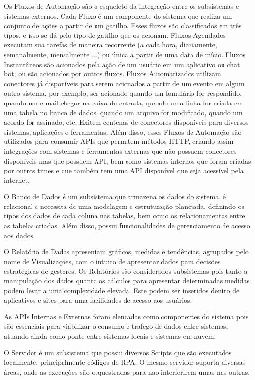 	Os Fluxos de Automação são o esqueleto da integração entre os subsistemas e sistemas externos. Cada Fluxo é um componente do sistema que realiza um conjunto de ações a partir de um gatilho.
	Esses fluxos são classificados em três tipos, e isso se dá pelo tipo de gatilho que os acionam.	Fluxos Agendados executam sua tarefas de maneira recorrente (a cada hora, diariamente,
	semanalmente, mensalmente ...) ou única a partir de uma data de início. Fluxos Instantâneos são acionados pela ação de um usuário em um aplicativo ou chat bot, ou são acionados por outros
	fluxos. Fluxos Automatizados utilizam conectores já disponíveis para serem acionados a partir de um evento em algum outro sistema, por exemplo, ser acionado quando um fomulário for respondido,
	quando um e-mail chegar na caixa de entrada, quando uma linha for criada em uma tabela no banco de dados, quando um arquivo for modificado, quando um acordo for assinado, etc. Exitem centenas
	de conectores disponíveis para diversos sistemas, aplicações e ferramentas.	Além disso, esses Fluxos de Automação são utilizados para consumir APIs que permitem métodos HTTP, criando assim 
	integrações com sistemas e ferramentas externas que não possuem conectores disponíveis mas que possuem API, bem como sistemas internos que foram criadas por outros times e que também tem
	uma API disponível que seja acessível pela internet.

	O Banco de Dados é um subsistema que armazena os dados do sistema, é relacional e necessita de uma modelagem e estruturação planejada, definindo os tipos dos dados de cada coluna nas tabelas,
	bem como os relacionamentos entre as tabelas criadas. Além disso, possui funcionalidades de gerenciamento de acesso aos dados.

	O Relatório de Dados apresentam gráficos, medidas e tendências, agrupados pelo nome de Visualizações, com o intuito de apresentar dados para decisões estratégicas de gestores. Os Relatórios
	são considerados subsistemas pois tanto	a manipulação dos dados quanto os cálculos para apresentar determinadas medidas podem levar a uma complexidade elevada. Este podem ser inseridos dentro
	de aplicativos e sites para uma facilidades de acesso aos usuários.

	As APIs Internas e Externas foram elencadas como componentes do sistema pois são essenciais para viabilizar o consumo e trafego de dados entre sistemas, atuando ainda como ponte entre sistemas
	locais e sistemas em nuvem.

	O Servidor é um subsistema que possui diversos Scripts que são executados localmente, principalmente códigos de RPA. O mesmo servidor suporta diversas áreas, onde as execuçòes são orquestradas
	para nao interferirem umas nas outras.

